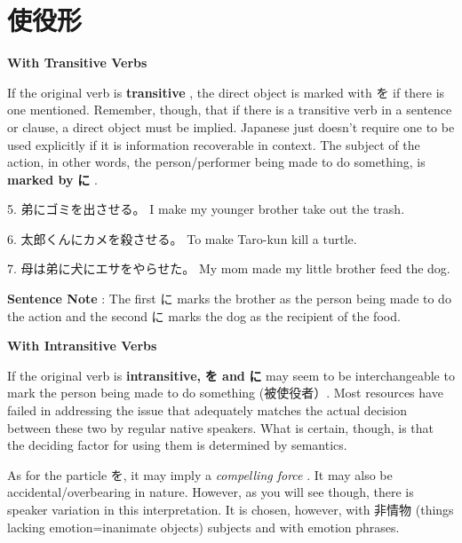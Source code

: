 \section{使役形}
 
\begin{center}
\textbf{With Transitive Verbs }
\end{center}

\par{ If the original verb is \textbf{transitive }, the direct object is marked with を if there is one mentioned. Remember, though, that if there is a transitive verb in a sentence or clause, a direct object must be implied. Japanese just doesn't require one to be used explicitly if it is information recoverable in context. The subject of the action, in other words, the person\slash performer being made to do something, is \textbf{marked by }\textbf{に }. }
 
\par{5. 弟にゴミを出させる。 \hfill\break
I make my younger brother take out the trash. }

\par{6. 太郎くんにカメを殺させる。 \hfill\break
To make Taro-kun kill a turtle. }

\par{7. 母は弟に犬にエサをやらせた。 \hfill\break
My mom made my little brother feed the dog. }

\par{\textbf{Sentence Note }: The first に marks the brother as the person being made to do the action and the second に marks the dog as the recipient of the food. }

\begin{center}
 \textbf{With Intransitive Verbs }
\end{center}
 
\par{ If the original verb is \textbf{intransitive, }\textbf{を and }\textbf{に }may seem to be interchangeable to mark the person being made to do something (被使役者）. Most resources have failed in addressing the issue that adequately matches the actual decision between these two by regular native speakers. What is certain, though, is that the deciding factor for using them is determined by semantics. }

\par{ As for the particle を, it may imply a \emph{compelling force }. It may also be accidental\slash overbearing in nature. However, as you will see though, there is speaker variation in this interpretation. It is chosen, however, with 非情物 (things lacking emotion=inanimate objects) subjects and with emotion phrases. }

